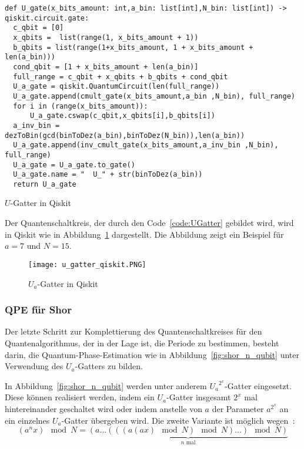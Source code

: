 \begin{listing}[H]
\begin{verbatim}  
def U_gate(x_bits_amount: int,a_bin: list[int],N_bin: list[int]) -> qiskit.circuit.gate:  
  c_qbit = [0]
  x_qbits =  list(range(1, x_bits_amount + 1))
  b_qbits = list(range(1+x_bits_amount, 1 + x_bits_amount + len(a_bin)))
  cond_qbit = [1 + x_bits_amount + len(a_bin)]
  full_range = c_qbit + x_qbits + b_qbits + cond_qbit
  U_a_gate = qiskit.QuantumCircuit(len(full_range))
  U_a_gate.append(cmult_gate(x_bits_amount,a_bin ,N_bin), full_range)
  for i in (range(x_bits_amount)):
      U_a_gate.cswap(c_qbit,x_qbits[i],b_qbits[i])
  a_inv_bin = dezToBin(gcd(binToDez(a_bin),binToDez(N_bin)),len(a_bin))
  U_a_gate.append(inv_cmult_gate(x_bits_amount,a_inv_bin ,N_bin), full_range)
  U_a_gate = U_a_gate.to_gate()
  U_a_gate.name = "  U_" + str(binToDez(a_bin))
  return U_a_gate
  \end{verbatim}
  \caption{\(U\)-Gatter in Qiskit}
  \label{code:UGatter}
\end{listing}

Der Quantenschaltkreis, der durch den Code~\ref{code:UGatter} gebildet wird, 
wird in Qiskit wie in Abbildung~\ref{fig:u_gatter_qiskit} dargestellt. 
Die Abbildung zeigt ein Beispiel für \(a=7\) und \(N=15\).

\begin{figure}[H]
  \centering
  \texttt{[image: u\_gatter\_qiskit.PNG]}
  \caption{\(U_a\)-Gatter in Qiskit}
  \label{fig:u_gatter_qiskit}
\end{figure}

\subsubsection{QPE für Shor} \label{section:imp_QPE_Shor}
Der letzte Schritt zur Komplettierung des Quantenschaltkreises für den Quantenalgorithmus, 
der in der Lage ist, 
die Periode zu bestimmen, besteht darin, 
die Quantum-Phase-Estimation wie in Abbildung~\ref{fig:shor_n_qubit} unter Verwendung des \(U_a\)-Gatters zu bilden.

In Abbildung~\ref{fig:shor_n_qubit} werden unter anderem \({U_a}^{2^x}\)-Gatter eingesetzt.
Diese können realisiert werden, 
indem ein \({U_a}\)-Gatter insgesamt \(2^x\) mal hintereinander geschaltet wird oder 
indem anstelle von \(a\) der Parameter \(a^{2^x}\) an ein einzelnes \(U_a\)-Gatter übergeben wird.
Die zweite Variante ist möglich wegen~\cite{beauregard2003circuit}:
\[(a^nx)\mod N = \underbrace{(a...(((a(ax)\mod N)\mod N)...)\mod N)}_{\text{\(n\) mal}}\]

